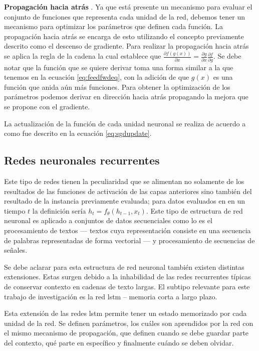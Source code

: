 \textbf{Propagación hacia atrás} \parencite{rumelhart1986learning}. Ya que está presente un mecanismo para evaluar el conjunto de funciones que representa cada unidad de la red, debemos tener un mecanismo para optimizar los parámetros que definen cada función. La propagación hacia atrás se encarga de esto utilizando el concepto previamente descrito como el descenso de gradiente. Para realizar la propagación hacia atrás se aplica la regla de la cadena la cual establece que $\frac{\partial f(g(x))}{\partial x} = \frac{\partial g}{\partial x} \frac{\partial f}{\partial g}$. Se debe notar que la función que se quiere derivar toma una forma similar a la que tenemos en la ecuación \ref{eq:feedfwdeq}, con la adición de que $g(x)$ es una función que anida aún más funciones. Para obtener la optimización de los parámetros podemos derivar en dirección hacia atrás propagando la mejora que se propone con el gradiente.

La actualización de la función de cada unidad neuronal se realiza de acuerdo a como fue descrito en la ecuación \ref{eq:sgdupdate}.

\subsection{Redes neuronales recurrentes}



Este tipo de redes tienen la peculiaridad que se alimentan no solamente de los resultados de las funciones de activación de las capas anteriores sino también del resultado de la instancia previamente evaluada; para datos evaluados en en un tiempo $t$ la definición sería $h_t = f_{\theta}(h_{t-1}, x_t)$. Este tipo de estructura de red neuronal es aplicado a conjuntos de datos secuenciales como lo es el procesamiento de textos --- textos cuya representación consiste en una secuencia de palabras representadas de forma vectorial --- y procesamiento de secuencias de señales.

Se debe aclarar para esta estructura de red neuronal también existen distintas extensiones. Estas surgen debido a la inhabilidad de las redes recurrentes típicas de conservar contexto en cadenas de texto largas. El subtipo relevante para este trabajo de investigación es la red \gls{lstm} -- memoria corta a largo plazo. 

Esta extensión de las redes \gls{lstm} permite tener un estado memorizado por cada unidad de la red. Se definen parámetros, los cuáles son aprendidos por la red con el mismo mecanismo de propagación, que definen cuando se debe guardar parte del contexto, qué parte en específico y finalmente cuándo se deben olvidar.

